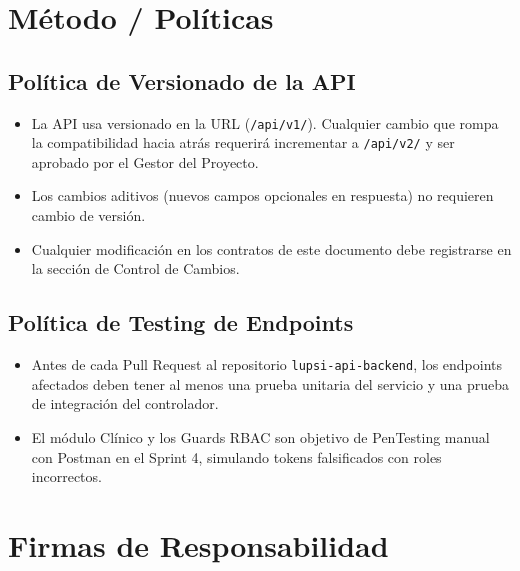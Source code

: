 \documentclass[a4paper,12pt]{article}
\renewcommand{\arraystretch}{1.1}
\begin{document}
\section{Método / Políticas}

\subsection{Política de Versionado de la API}

\begin{itemize}
\item La API usa versionado en la URL (\texttt{/api/v1/}). Cualquier cambio que rompa la compatibilidad hacia atrás requerirá incrementar a \texttt{/api/v2/} y ser aprobado por el Gestor del Proyecto.
\item Los cambios aditivos (nuevos campos opcionales en respuesta) no requieren cambio de versión.
\item Cualquier modificación en los contratos de este documento debe registrarse en la sección de Control de Cambios.
\end{itemize}

\subsection{Política de Testing de Endpoints}

\begin{itemize}
\item Antes de cada Pull Request al repositorio \texttt{lupsi-api-backend}, los endpoints afectados deben tener al menos una prueba unitaria del servicio y una prueba de integración del controlador.
\item El módulo Clínico y los Guards RBAC son objetivo de PenTesting manual con Postman en el Sprint 4, simulando tokens falsificados con roles incorrectos.
\end{itemize}

\section{Firmas de Responsabilidad}

\renewcommand{\arraystretch}{2}
\end{document}
